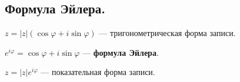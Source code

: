 \subsection{
    Формула Эйлера.
}

$z = |z|(\cos \varphi + i \sin \varphi)$ — тригонометрическая форма записи.

$e^{i\varphi} = \cos \varphi + i \sin \varphi$ — \textbf{формула Эйлера}.

$z = |z|e^{i\varphi}$ — показательная форма записи.
